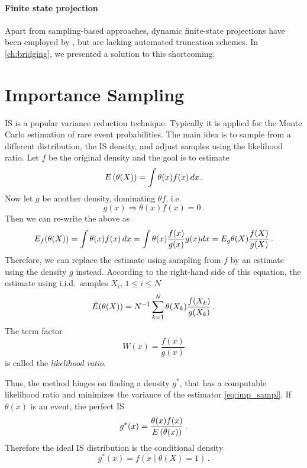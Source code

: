 \paragraph{Finite state projection}
Apart from sampling-based approaches, dynamic finite-state
projections have been employed by \citet{mikeev2013numerical}, but
are lacking automated truncation schemes.
In \autoref{ch:bridging}, we presented a solution to this shortcoming.

\section{Importance Sampling}
\Acf{IS} is  a popular variance reduction technique.
Typically it is applied for the Monte Carlo estimation of rare event
probabilities.
The main idea is to sample from a different distribution, the \ac{IS}
density, and adjust samples using the likelihood ratio.
Let $f$ be the original density and the goal is to estimate
\[
  {E}\left(\theta(X)\right) = \int \theta(x)f(x)\,dx\,.
\]
Now let $g$ be another density, dominating $\theta f$,
i.e.\ \[g(x)\Rightarrow \theta(x)f(x) = 0\,.\] Then we can re-write the above as
\[
  {E}_f({\theta(X)}) = \int \theta(x)f(x)\,dx = \int \theta(x)
  \frac{f(x)}{g(x)} g(x) dx = {E}_g \theta(X) \frac{f(X)}{g(X)}\,.
\]
Therefore, we can replace the estimate using sampling from $f$ by an
estimate using the density $g$ instead.
According to the right-hand side of this equation, the estimate using
i.i.d.\ samples $X_i$, $1\leq i \leq N$
\begin{equation}\label{eq:imp_sampl}
  \hat{{E}}(\theta(X)) = N^{-1} \sum_{k=1}^N \theta(X_k)
  \frac{f(X_k)}{g(X_k)}\,.
\end{equation}
The term factor
\[
  W(x) = \frac{f(x)}{g(x)}
\]
is called the \emph{likelihood ratio}.

Thus, the method hinges on finding a density $g^{*}$, that has a
computable likelihood ratio and  minimizes the variance of the
estimator \eqref{eq:imp_sampl}.
If $\theta(x)$ is an event, the perfect \ac{IS}
\parencite[Chapter~9.7.1]{kroese2013handbook}
\[
  g^*(x) = \frac{\theta(x) f(x)}{{E}\left(\theta(x)\right)}\,.
\]
Therefore the ideal \ac{IS} distribution is the conditional density
\[
  g^*(x) = f(x \mid \theta(X) = 1)\,.
\]

